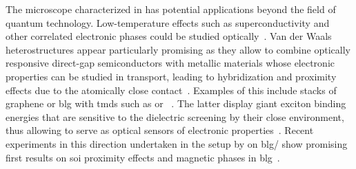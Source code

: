 The microscope characterized in \thispart has potential applications beyond the field of quantum technology.
Low-temperature effects such as superconductivity and other correlated electronic phases could be studied optically~\cite{Hadfield2016,Arora2020,Zhang2023}.
Van der Waals heterostructures appear particularly promising as they allow to combine optically responsive direct-gap semiconductors with metallic materials whose electronic properties can be studied in transport, leading to hybridization and proximity effects due to the atomically close contact~\cite{Geim2013}.
Examples of this include stacks of graphene or \gls{blg} with \glspl{tmd} such as  or ~\cite{Popert2022,Masseroni2024,Xie2024,Seiler2025}.
The latter display giant exciton binding energies that are sensitive to the dielectric screening by their close environment, thus allowing to serve as optical sensors of electronic properties~\cite{Popert2022,Tebbe2023}.
Recent experiments in this direction undertaken in the setup by \citet{Tebbe2025} on \acrshort{blg}/ show promising first results on \gls{soi} proximity effects and magnetic phases in \gls{blg}~\cite{Icking2024}.
